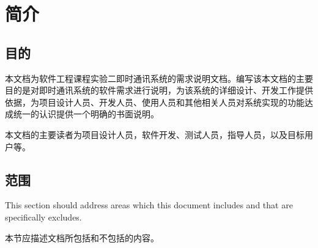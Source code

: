 \chapter{简介}
\section{目的}


本文档为软件工程课程实验二即时通讯系统的需求说明文档。编写该本文档的主要目的是对即时通讯系统的软件需求进行说明，为该系统的详细设计、开发工作提供依据，为项目设计人员、开发人员、使用人员和其他相关人员对系统实现的功能达成统一的认识提供一个明确的书面说明。

本文档的主要读者为项目设计人员，软件开发、测试人员，指导人员，以及目标用户等。

\section{范围}
This section should address areas which this document includes and that are specifically excludes. 

本节应描述文档所包括和不包括的内容。
